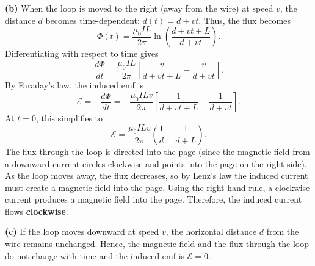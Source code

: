 \documentclass{article}
\begin{document}
\textbf{(b)} When the loop is moved to the right (away from the wire) at speed \(v\), the distance \(d\) becomes time-dependent: \(d(t)=d+vt\). Thus, the flux becomes
\[
\Phi(t)=\frac{\mu_0 I L}{2\pi}\ln\left(\frac{d+vt+L}{d+vt}\right).
\]
Differentiating with respect to time gives
\[
\frac{d\Phi}{dt}=\frac{\mu_0 I L}{2\pi}\left[\frac{v}{d+vt+L}-\frac{v}{d+vt}\right].
\]
By Faraday’s law, the induced emf is
\[
\mathcal{E}=-\frac{d\Phi}{dt}=-\frac{\mu_0 I L v}{2\pi}\left[\frac{1}{d+vt+L}-\frac{1}{d+vt}\right].
\]
At \(t=0\), this simplifies to
\[
\mathcal{E}=\frac{\mu_0 I L v}{2\pi}\left(\frac{1}{d}-\frac{1}{d+L}\right).
\]
The flux through the loop is directed into the page (since the magnetic field from a downward current circles clockwise and points into the page on the right side). As the loop moves away, the flux decreases, so by Lenz’s law the induced current must create a magnetic field into the page. Using the right‐hand rule, a clockwise current produces a magnetic field into the page. Therefore, the induced current flows \textbf{clockwise}.

\textbf{(c)} If the loop moves downward at speed \(v\), the horizontal distance \(d\) from the wire remains unchanged. Hence, the magnetic field and the flux through the loop do not change with time and the induced emf is \(\mathcal{E}=0\).
\end{document}
